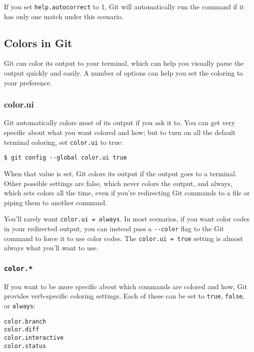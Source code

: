 \documentclass[a4paper]{book}
\begin{document}
If you set \texttt{help.autocorrect} to 1, Git will automatically run the command if it has only one match under this scenario.

\subsection{Colors in Git}\label{colors-in-git}

Git can color its output to your terminal, which can help you visually parse the output quickly and easily. A number of options can help you set the coloring to your preference.

\subsubsection{color.ui}

Git automatically colors most of its output if you ask it to. You can get very specific about what you want colored and how; but to turn on all the default terminal coloring, set \texttt{color.ui} to true:

\begin{shaded}\begin{verbatim}
$ git config --global color.ui true
\end{verbatim}\end{shaded}

When that value is set, Git colors its output if the output goes to a terminal. Other possible settings are false, which never colors the output, and always, which sets colors all the time, even if you're redirecting Git commands to a file or piping them to another command.

You'll rarely want \texttt{color.ui = always}. In most scenarios, if you want color codes in your redirected output, you can instead pass a \texttt{-{}-color} flag to the Git command to force it to use color codes. The \texttt{color.ui = true} setting is almost always what you'll want to use.

\subsubsection{\texttt{color.*}}

If you want to be more specific about which commands are colored and how, Git provides verb-specific coloring settings. Each of these can be set to \texttt{true}, \texttt{false}, or \texttt{always}:

\begin{shaded}\begin{verbatim}
color.branch
color.diff
color.interactive
color.status
\end{verbatim}\end{shaded}
\end{document}
